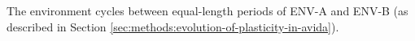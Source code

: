 



The environment cycles between equal-length periods of ENV-A and ENV-B (as described in Section \ref{sec:methods:evolution-of-plasticity-in-avida}).


